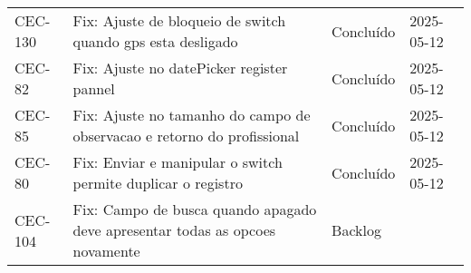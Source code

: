 \begin{longtable}{@{}lp{7cm}ll@{}}
CEC-130 & Fix: Ajuste de bloqueio de switch quando gps esta desligado & Concluído & 2025-05-12 \\
CEC-82 & Fix: Ajuste no datePicker register pannel & Concluído & 2025-05-12 \\
CEC-85 & Fix: Ajuste no tamanho do campo de observacao e retorno do profissional & Concluído & 2025-05-12 \\
CEC-80 & Fix: Enviar e manipular o switch permite duplicar o registro & Concluído & 2025-05-12 \\
CEC-104 & Fix: Campo de busca quando apagado deve apresentar todas as opcoes novamente & Backlog & \\

\end{longtable}
